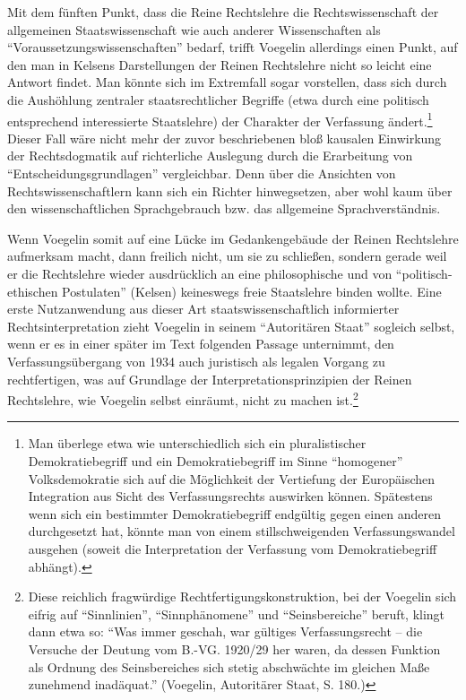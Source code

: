 \documentclass[12pt,a4paper,ngerman]{article}
\begin{document}
Mit dem fünften Punkt, dass die Reine Rechtslehre die Rechtswissenschaft der
allgemeinen Staatswissenschaft wie auch anderer Wissenschaften als
"`Voraussetzungswissenschaften"' bedarf, trifft Voegelin allerdings einen
Punkt, auf den man in Kelsens Darstellungen der Reinen Rechtslehre nicht so
leicht eine Antwort findet. Man könnte sich im Extremfall sogar vorstellen,
dass sich durch die Aushöhlung zentraler staatsrechtlicher Begriffe
(etwa durch eine politisch entsprechend interessierte Staatslehre) der
Charakter der Verfassung ändert.\footnote{Man überlege etwa wie
  unterschiedlich sich ein pluralistischer Demokratiebegriff und ein
  Demokratiebegriff im Sinne "`homogener"' Volksdemokratie sich auf die
  Möglichkeit der Vertiefung der Europäischen Integration aus Sicht des
  Verfassungsrechts auswirken können. Spätestens wenn sich ein bestimmter
  Demokratiebegriff endgültig gegen einen anderen durchgesetzt hat, könnte man
  von einem stillschweigenden Verfassungswandel ausgehen (soweit die
  Interpretation der Verfassung vom Demokratiebegriff abhängt).} Dieser Fall
wäre nicht mehr der zuvor beschriebenen bloß kausalen Einwirkung der
Rechtsdogmatik auf richterliche Auslegung durch die Erarbeitung von
"`Entscheidungsgrundlagen"' vergleichbar. Denn über die Ansichten von
Rechtswissenschaftlern kann sich ein Richter hinwegsetzen, aber wohl kaum über
den wissenschaftlichen Sprachgebrauch bzw. das allgemeine Sprachverständnis.

Wenn Voegelin somit auf eine Lücke im Gedankengebäude der Reinen Rechtslehre
aufmerksam macht, dann freilich nicht, um sie zu schließen, sondern gerade
weil er die Rechtslehre wieder ausdrücklich an eine philosophische und von
"`politisch-ethischen Postulaten"' (Kelsen) keineswegs freie Staatslehre
binden wollte. Eine erste Nutzanwendung aus dieser Art staatswissenschaftlich
informierter Rechtsinterpretation zieht Voegelin in seinem "`Autoritären
Staat"' sogleich selbst, wenn er es in einer später im Text folgenden Passage
unternimmt, den Verfassungsübergang von 1934 auch juristisch als legalen
Vorgang zu rechtfertigen, was auf Grundlage der Interpretationsprinzipien der
Reinen Rechtslehre, wie Voegelin selbst einräumt, nicht zu machen
ist.\footnote{Diese reichlich fragwürdige Rechtfertigungskonstruktion, bei der
  Voegelin sich eifrig auf "`Sinnlinien"', "`Sinnphänomene"' und
  "`Seinsbereiche"' beruft, klingt dann etwa so: "`Was immer geschah, war
  gültiges Verfassungsrecht -- die Versuche der Deutung vom B.-VG.  1920/29
  her waren, da dessen Funktion als Ordnung des Seinsbereiches sich stetig
  abschwächte im gleichen Maße zunehmend inadäquat."' (Voegelin, Autoritärer
  Staat, S. 180.)}
\end{document}
